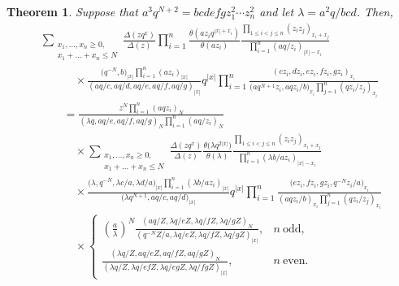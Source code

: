 \documentclass[pdftex]{sigma}
\numberwithin{equation}{section}
\newtheorem{Theorem}{Theorem}[section]
\begin{document}
\begin{Theorem}\label{bt}
Suppose that $a^3q^{N+2}=bcdefgz_1^2\dotsm z_n^2$ and let $\lambda=a^2q/bcd$. Then,
\begin{gather}
\sum_{\substack{x_1,\dots,x_n\geq 0,\\x_1+\dots+x_n\leq N}}
\frac{\Delta(zq^x)}{\Delta(z)}\prod\limits_{i=1}^n\frac{\theta(az_iq^{|x|+x_i})}{\theta(az_i)}
\frac{\prod\limits_{1\leq i<j\leq n}(z_iz_j)_{x_i+x_j}}{\prod\limits_{i=1}^n(aq/z_i)_{|x|-x_i}}\nonumber\\
\qquad\quad{}\times\frac{\big(q^{-N},b\big)_{|x|}\prod\limits_{i=1}^n(az_i)_{|x|}}{(aq/c,aq/d,aq/e,aq/f,aq/g)_{|x|}} q^{|x|}\prod\limits_{i=1}^n
\frac{(cz_i,dz_i,ez_i,fz_i,gz_i)_{x_i}}{\big(aq^{N+1}z_i,aqz_i/b\big)_{x_i}\prod\limits_{j=1}^n(qz_i/z_j)_{x_i}}\nonumber\\
\qquad{} =\frac{z^N\prod\limits_{i=1}^n(aqz_i)_N}{(\lambda q,aq/e,aq/f,aq/g)_{N}\prod\limits_{i=1}^n(aq/z_i)_N}\nonumber\\
 \qquad\quad{} \times\sum_{\substack{x_1,\dots,x_n\geq 0,\\x_1+\dots+x_n\leq N}}
\frac{\Delta(zq^x)}{\Delta(z)}\frac{\theta\big(\lambda q^{2|x|}\big)}{\theta(\lambda)}
\frac{\prod\limits_{1\leq i<j\leq n}(z_iz_j)_{x_i+x_j}}{\prod\limits_{i=1}^n(\lambda b/az_i)_{|x|-x_i}}\nonumber\\
 \qquad\quad{} \times\frac{\big(\lambda,q^{-N},\lambda c/a,\lambda d/a\big)_{|x|}\prod\limits_{i=1}^n(\lambda b/az_i)_{|x|}}{\big(\lambda q^{N+1},aq/c,aq/d\big)_{|x|}}q^{|x|}\prod\limits_{i=1}^n\frac{\big(ez_i,fz_i,gz_i,q^{-N}z_i/a\big)_{x_i}}{(aqz_i/b)_{x_i}
 \prod\limits_{j=1}^n(qz_i/z_j)_{x_i}}\nonumber\\
 \qquad\quad{}\times\begin{cases}\displaystyle\left(\frac{a}\lambda\right)^N\frac{(aq/Z,\lambda q/eZ,\lambda q/fZ,\lambda q/gZ)_N}{(q^{-N}Z/a,\lambda q/eZ,\lambda q/fZ,\lambda q/gZ)_{|x|}}, & n~\text{odd},\\[4mm]
\displaystyle\frac{(\lambda q/Z,a q/eZ,a q/fZ,a q/gZ)_N}{(\lambda q/Z,\lambda q/efZ,\lambda q/egZ,\lambda q/fgZ)_{|x|}}, & n~\text{even}.
\end{cases}
\label{bi}\end{gather}
\end{Theorem}
\end{document}
